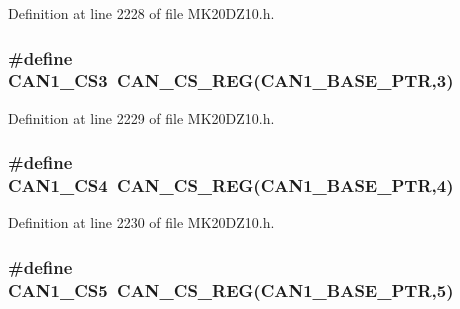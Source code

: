 Definition at line 2228 of file M\+K20\+D\+Z10.\+h.

\subsubsection[{\texorpdfstring{C\+A\+N1\+\_\+\+C\+S3}{CAN1_CS3}}]{\setlength{\rightskip}{0pt plus 5cm}\#define C\+A\+N1\+\_\+\+C\+S3~{\bf C\+A\+N\+\_\+\+C\+S\+\_\+\+R\+EG}({\bf C\+A\+N1\+\_\+\+B\+A\+S\+E\+\_\+\+P\+TR},3)}\hypertarget{group___c_a_n___register___accessor___macros_gac334b14dff765b31f7a17f6e21370127}{}\label{group___c_a_n___register___accessor___macros_gac334b14dff765b31f7a17f6e21370127}


Definition at line 2229 of file M\+K20\+D\+Z10.\+h.

\subsubsection[{\texorpdfstring{C\+A\+N1\+\_\+\+C\+S4}{CAN1_CS4}}]{\setlength{\rightskip}{0pt plus 5cm}\#define C\+A\+N1\+\_\+\+C\+S4~{\bf C\+A\+N\+\_\+\+C\+S\+\_\+\+R\+EG}({\bf C\+A\+N1\+\_\+\+B\+A\+S\+E\+\_\+\+P\+TR},4)}\hypertarget{group___c_a_n___register___accessor___macros_ga7c5fdacaeef335e7ece63fc7980825d1}{}\label{group___c_a_n___register___accessor___macros_ga7c5fdacaeef335e7ece63fc7980825d1}


Definition at line 2230 of file M\+K20\+D\+Z10.\+h.

\subsubsection[{\texorpdfstring{C\+A\+N1\+\_\+\+C\+S5}{CAN1_CS5}}]{\setlength{\rightskip}{0pt plus 5cm}\#define C\+A\+N1\+\_\+\+C\+S5~{\bf C\+A\+N\+\_\+\+C\+S\+\_\+\+R\+EG}({\bf C\+A\+N1\+\_\+\+B\+A\+S\+E\+\_\+\+P\+TR},5)}\hypertarget{group___c_a_n___register___accessor___macros_ga75fde13598a57d45629c38227fbea02c}{}\label{group___c_a_n___register___accessor___macros_ga75fde13598a57d45629c38227fbea02c}



